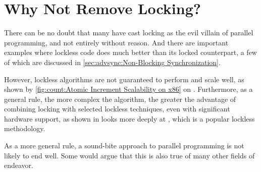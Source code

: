 
\section{Why Not Remove Locking?}
\label{sec:app:questions:Why Not Remove Locking?}

There can be no doubt that many have cast locking as the evil villain
of parallel programming, and not entirely without reason.
And there are important examples where lockless code does much better
than its locked counterpart, a few of which are discussed in
\cref{sec:advsync:Non-Blocking Synchronization}.

However, lockless algorithms are not guaranteed to perform and scale
well, as shown by
\cref{fig:count:Atomic Increment Scalability on x86} on
.
Furthermore, as a general rule, the more complex the algorithm,
the greater the advantage of combining locking with selected
lockless techniques, even with significant hardware support,
as shown in
looks more deeply at , which is a popular
lockless methodology.

As a more general rule, a sound-bite approach to parallel programming
is not likely to end well.
Some would argue that this is also true of many other fields of endeavor.
